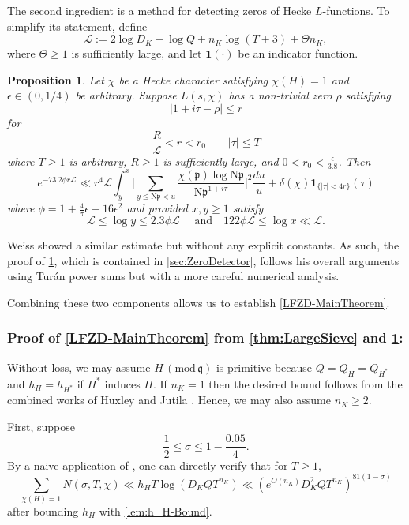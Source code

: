 \documentclass[12pt,psamsfonts]{amsart}
\newtheorem{prop}[thm]{Proposition}
\theoremstyle{definition}
\theoremstyle{remark}
\numberwithin{equation}{section}
\theoremstyle{plain}
\theoremstyle{remark}
\renewcommand{\1}{ {\bf 1}}
\newcommand{\cL}{\mathcal{L}}
\renewcommand{\pmod}[1]{\, (\mathrm{mod} {\, #1})}
\newcommand{\N}{\mathrm{N}}
\newcommand{\kp}{\mathfrak{p}}
\newcommand{\kq}{\mathfrak{q}}
\begin{document}
The second ingredient is a method for detecting zeros of Hecke $L$-functions. To simplify its statement, define
\begin{equation}
\cL := 2 \log D_K + \log Q + n_K \log(T+3) +  \Theta n_K,
\label{def:cL}
\end{equation}
where $\Theta \geq 1$ is sufficiently large, and let $\mathbf{1}( \cdot )$ be an indicator function.  

\begin{prop}
\label{prop:ZeroDetector}
Let $\chi$ be a Hecke character satisfying $\chi(H) = 1$ and $\epsilon \in (0,1/4)$ be arbitrary. Suppose $L(s,\chi)$ has a non-trivial zero $\rho$ satisfying
\[
|1+i\tau - \rho| \leq r
\]
for
\[
\frac{R}{\cL} < r < r_0 \qquad |\tau| \leq T
\]
where $T \geq 1$ is arbitrary, $R \geq 1$ is sufficiently large, and $0 < r_0 < \frac{\epsilon}{3.8}$. Then 
\[
e^{- 73.2 \phi r \cL}   \ll  r^4 \cL  \int_y^x \Big| \sum_{y \leq \N\kp < u} \frac{\chi(\kp) \log \N \kp  }{\N\kp^{1+i\tau}}  \Big|^2 \frac{du}{u}  + \delta(\chi) \mathbf{1}_{\{ |\tau| < 4r \}}(\tau)
\]
where $\phi = 1 + \tfrac{4}{\pi} \epsilon + 16\epsilon^2$ and provided $x,y \geq 1$ satisfy
\begin{equation}
\cL \leq \log y \leq 2.3 \phi \cL \quad \text{ and} \quad 122 \phi \cL \leq \log x \ll \cL.
\end{equation}
\end{prop}
Weiss \cite[Lemma 4.2]{Weiss} showed a similar estimate but without any explicit constants. As such, the proof of \cref{prop:ZeroDetector}, which is contained in \cref{sec:ZeroDetector}, follows his overall arguments using Tur\'{a}n power sums but with a more careful numerical analysis.   

Combining these two components allows us to establish \cref{LFZD-MainTheorem}. 

\subsubsection*{Proof of \cref{LFZD-MainTheorem} from \cref{thm:LargeSieve} and \cref{prop:ZeroDetector}:}  Without loss, we may assume $H \pmod{\kq}$ is primitive because $Q= Q_H = Q_{H^*}$ and $h_H = h_{H^*}$ if $H^*$ induces $H$. If $n_K=1$ then the desired bound follows from the combined works of Huxley \cite{Huxley} and Jutila \cite{Jutila}.  Hence, we may also assume $n_K \geq 2$.

First, suppose 
\[
\frac{1}{2} \leq \sigma \leq 1 -  \frac{0.05}{4}.
\]
By a naive application of \cite[Lemma 2.1]{LMO}, one can directly verify that for $T \geq 1$,
\begin{equation}
\sum_{\chi(H)=1} N(\sigma, T,\chi) \ll h_H T \log( D_K Q T^{n_K}) \ll ( e^{O(n_K)} D_K^2QT^{n_K})^{81(1-\sigma)} 
\label{eqn:ThickStrip}
\end{equation}
after bounding $h_H$ with \cref{lem:h_H-Bound}.
\end{document}
